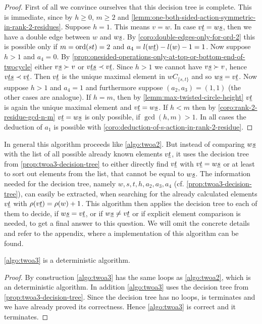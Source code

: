 \begin{prop}
	\begin{proof}
		First of all we convince ourselves that this decision tree is complete. This is immediate, since by $h \geq 0$, $m \geq 2$ and \ref{lemm:one-both-sided-action-symmetric-in-rank-2-residues}. Suppose $h=1$. This means $v = w$. In case $v \underline{t} = w \underline{s}$, then we have a double edge between $w$ and $w \underline{s}$. By \ref{coro:double-edges-only-for-ord-2} this is possible only if $m = \operatorname{ord}(st) = 2$ and $a_4 = l(w \underline{t}) - l(w) - 1 = 1$. Now suppose $h > 1$ and $a_4=0$. By \ref{prop:onesided-operations-only-at-top-or-bottom-end-of-twocycle} either $v \underline{s} \succ v$ or $v \underline{t} \underline{s} \prec v \underline{t}$. Since $h > 1$ we cannot have $v \underline{s} \succ v$, hence $v \underline{t} \underline{s} \prec v \underline{t}$. Then $v \underline{t}$ is the unique maximal element in $wC_{\{s,t\}}$ and so $w \underline{s} = v \underline{t}$. Now suppose $h > 1$ and $a_4=1$ and furthermore suppose $(a_2,a_3)=(1,1)$ (the other cases are analogue). If $h = m$, then by \ref{lemm:max-twisted-circle-height} $v \underline{t}$ is again the unique maximal element and $v \underline{t} = w \underline{s}$. If $h < m$ then by \ref{coro:rank-2-residue-gcd-n-m} $v \underline{t} = w \underline{s}$ is only possible, if $\gcd(h,m) > 1$. In all cases the deduction of $a_1$ is possible with \ref{coro:deduction-of-s-action-in-rank-2-residue}.
	\end{proof}
\end{prop}

\begin{algo}[TWOA3]
	In general this algorithm proceeds like \ref{algo:twoa2}. But instead of comparing $w \underline{s}$ with the list of all possible already known elements $v \underline{t}$, it uses the decision tree from \ref{prop:twoa3-decision-tree} to either directly find $v \underline{t}$ with $v \underline{t} = w \underline{s}$ or at least to sort out elements from the list, that cannot be equal to $w \underline{s}$. The information needed for the decision tree, namely $w, s, t, h, a_2, a_3, a_4$ (cf. \ref{prop:twoa3-decision-tree}), can easily be extracted, when searching for the already calculated elements $v \underline{t}$ with $\rho(v \underline{t}) = \rho(w) + 1$. This algorithm then applies the decision tree to each of them to decide, if $w \underline{s} = v \underline{t}$, or if $w \underline{s} \neq v \underline{t}$ or if explicit element comparison is needed, to get a final answer to this question. We will omit the concrete details and refer to the appendix, where a implementation of this algorithm can be found.
\end{algo}

\begin{lemm}
	\ref{algo:twoa3} is a deterministic algorithm.

	\begin{proof}
		By construction \ref{algo:twoa3} has the same loops as \ref{algo:twoa2}, which is an deterministic algorithm. In addition \ref{algo:twoa3} uses the decision tree from \ref{prop:twoa3-decision-tree}. Since the decision tree has no loops, is terminates and we have already proved its correctness. Hence \ref{algo:twoa3} is correct and it terminates.
	\end{proof}
\end{lemm}

